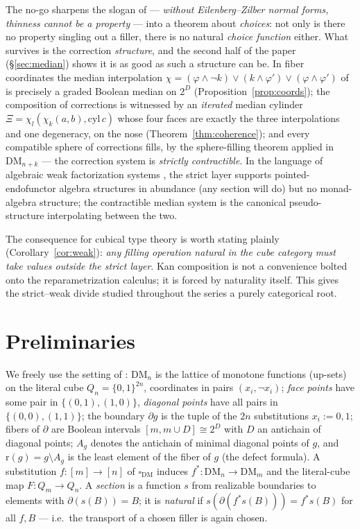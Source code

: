 \documentclass[11pt]{amsart}
\theoremstyle{definition}
\newcommand{\DM}{\mathrm{DM}}
\newcommand{\cube}{\square_{\mathrm{DM}}}
\newcommand{\lc}{Q}
\newcommand{\bnd}{\partial}
\newcommand{\rmin}{\mathrm{r}}
\newcommand{\cyl}{\mathrm{cyl}}
\begin{document}
The no-go sharpens the slogan of \cite{StrictDM} --- \emph{without
Eilenberg--Zilber normal forms, thinness cannot be a property} ---
into a theorem about \emph{choices}: not only is there no
property singling out a filler, there is no natural \emph{choice
function} either.  What survives is the correction
\emph{structure}, and the second half of the paper
(\S\ref{sec:median}) shows it is as good as such a structure can
be.  In fiber coordinates the median interpolation
$\chi = (\varphi \wedge \neg k) \vee (k \wedge \varphi') \vee
(\varphi \wedge \varphi')$ of \cite{DMFibers} is precisely a graded
Boolean median on $2^{D}$ (Proposition~\ref{prop:coords}); the
composition of corrections is witnessed by an \emph{iterated}
median cylinder
$\Xi = \chi_{l}(\chi_{k}(a, b), \cyl\, c)$ whose four faces are
exactly the three interpolations and one degeneracy, on the nose
(Theorem~\ref{thm:coherence}); and every compatible sphere of
corrections fills, by the sphere-filling theorem applied in
$\DM_{n+k}$ --- the correction system is \emph{strictly
contractible}.  In the language of algebraic weak factorization
systems \cite{Garner}, the strict layer supports pointed-endofunctor
algebra structures in abundance (any section will do) but no
monad-algebra structure; the contractible median system is the
canonical pseudo-structure interpolating between the two.

The consequence for cubical type theory is worth stating plainly
(Corollary~\ref{cor:weak}): \emph{any filling operation natural in
the cube category must take values outside the strict layer}.  Kan
composition is not a convenience bolted onto the
reparametrization calculus; it is forced by naturality itself.
This gives the strict--weak divide studied throughout the series
\cite{Const, Convexity, WordProblems} a purely categorical root.

\section{Preliminaries}
\label{sec:prelim}

We freely use the setting of \cite{DMFibers, StrictDM}: $\DM_n$ is
the lattice of monotone functions (up-sets) on the literal cube
$\lc_n = \{0,1\}^{2n}$, coordinates in pairs $(x_i, \neg x_i)$;
\emph{face points} have some pair in $\{(0,1), (1,0)\}$,
\emph{diagonal points} have all pairs in $\{(0,0), (1,1)\}$; the
boundary $\bnd g$ is the tuple of the $2n$ substitutions
$x_i := 0, 1$; fibers of $\bnd$ are Boolean intervals
$[m, m \cup D] \cong 2^{D}$ with $D$ an antichain of diagonal
points; $A_g$ denotes the antichain of minimal diagonal points of
$g$, and $\rmin(g) = g \setminus A_g$ is the least element of the
fiber of $g$ (the defect formula).  A substitution
$f : [m] \to [n]$ of $\cube$ induces $f^{*} : \DM_n \to \DM_m$ and
the literal-cube map $F : \lc_m \to \lc_n$.  A \emph{section} is a
function $s$ from realizable boundaries to elements with
$\bnd(s(B)) = B$; it is \emph{natural} if
$s(\bnd(f^{*} s(B))) = f^{*} s(B)$ for all $f, B$ --- i.e.\ the
transport of a chosen filler is again chosen.
\end{document}
